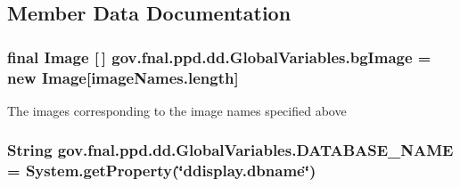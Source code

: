 \subsection{Member Data Documentation}
\hypertarget{classgov_1_1fnal_1_1ppd_1_1dd_1_1GlobalVariables_a912d45efb46176a8ccd9ce8e046695b0}{
\subsubsection[{bg\-Image}]{\setlength{\rightskip}{0pt plus 5cm}final Image \mbox{[}$\,$\mbox{]} gov.\-fnal.\-ppd.\-dd.\-Global\-Variables.\-bg\-Image = new Image\mbox{[}image\-Names.\-length\mbox{]}\hspace{0.3cm}{\ttfamily [static]}}}\label{classgov_1_1fnal_1_1ppd_1_1dd_1_1GlobalVariables_a912d45efb46176a8ccd9ce8e046695b0}
The images corresponding to the image names specified above \hypertarget{classgov_1_1fnal_1_1ppd_1_1dd_1_1GlobalVariables_a737045676a15c469e5cb486d80c08043}{
\subsubsection[{D\-A\-T\-A\-B\-A\-S\-E\-\_\-\-N\-A\-M\-E}]{\setlength{\rightskip}{0pt plus 5cm}String gov.\-fnal.\-ppd.\-dd.\-Global\-Variables.\-D\-A\-T\-A\-B\-A\-S\-E\-\_\-\-N\-A\-M\-E = System.\-get\-Property(\char`\"{}ddisplay.\-dbname\char`\"{})\hspace{0.3cm}{\ttfamily [static]}}}\label{classgov_1_1fnal_1_1ppd_1_1dd_1_1GlobalVariables_a737045676a15c469e5cb486d80c08043}
